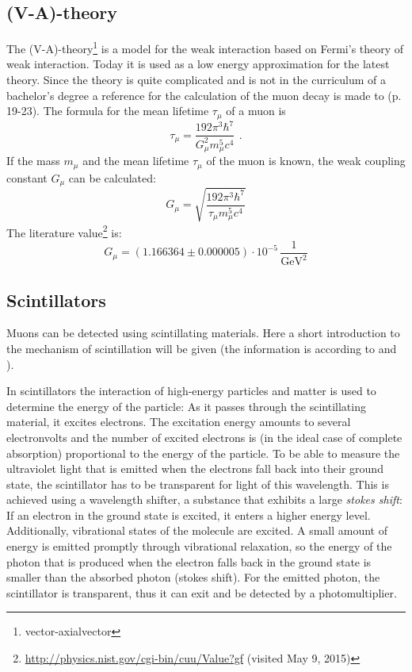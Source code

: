 \subsection{(V-A)-theory}
The (V-A)-theory\footnote{vector-axialvector} is a model for the weak interaction based on Fermi's theory of weak interaction. Today it is 
used as a low energy approximation for the latest theory. Since the theory is quite complicated and is not in the curriculum of a bachelor's 
degree a reference for the calculation of the muon decay is made to \cite{staatsex} (p. 19-23). The formula for the mean lifetime $\tau_\mu$ of a muon is
\begin{equation}
    \tau_\mu = \frac{192 \pi^3 \hbar^7}{G_\mu^2 m_\mu^5 c^4}\ \, .
\end{equation}
If the mass $m_\mu$ and the mean lifetime $\tau_\mu$ of the muon is known, the weak coupling constant $G_\mu$ can be calculated:
\begin{equation}
    \label{eq:weakcouplingconstant}
    G_\mu = \sqrt{\frac{192 \pi^3 \hbar^7}{\tau_\mu m_\mu^5 c^4}}
\end{equation}
The literature value\footnote{\url{http://physics.nist.gov/cgi-bin/cuu/Value?gf} (visited May 9, 2015)} is:
\begin{equation}
    \label{eq:litval:weakcouplingconstant}
    G_\mu = \left( 1.166364 \pm 0.000005 \right) \cdot 10^{-5}\,\frac{1}{\text{GeV}^2}
\end{equation}


\subsection{Scintillators}
Muons can be detected using scintillating materials.
Here a short introduction to the mechanism of scintillation will be given
(the information is according to \cite{dem4} and \cite{staatsex}).

In scintillators the interaction of high-energy particles and matter is used to determine
the energy of the particle:
As it passes through the scintillating material, it excites electrons.
The excitation energy amounts to several electronvolts and the number of excited electrons is (in the ideal case
of complete absorption) proportional to the energy of the particle.
To be able to measure the ultraviolet light that is emitted when the electrons fall back into their ground state,
the scintillator has to be transparent for light of this wavelength.
This is achieved using a wavelength shifter, a substance that exhibits a large \emph{stokes shift}:
If an electron in the ground state is excited, it enters a higher energy level.
Additionally, vibrational states of the molecule are excited.
A small amount of energy is emitted promptly through vibrational relaxation,
so the energy of the photon that is produced when the electron falls back in the ground state
is smaller than the absorbed photon (stokes shift).
For the emitted photon, the scintillator is transparent,
thus it can exit and be detected by a photomultiplier.

